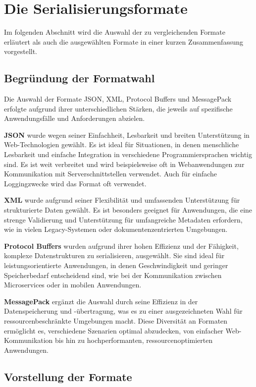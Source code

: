 \documentclass[ngerman]{seminarvorlage}
\begin{document}
\section{Die Serialisierungsformate}

Im folgenden Abschnitt wird die Auswahl der zu vergleichenden Formate erläutert als auch die ausgewählten Formate in einer kurzen Zusammenfassung vorgestellt.

\subsection{Begründung der Formatwahl}

Die Auswahl der Formate JSON, XML, Protocol Buffers und MessagePack erfolgte aufgrund ihrer unterschiedlichen Stärken, die jeweils auf spezifische Anwendungsfälle und Anforderungen abzielen.

\textbf{JSON} \cite{rfc8259} wurde wegen seiner Einfachheit, Lesbarkeit und breiten Unterstützung in Web-Technologien gewählt. Es ist ideal für Situationen, in denen menschliche Lesbarkeit und einfache Integration in verschiedene Programmiersprachen wichtig sind. Es ist weit verbreitet und wird beispielsweise oft in Webanwendungen zur Kommunikation mit Serverschnittstellen verwendet. Auch für einfache Loggingzwecke wird das Format oft verwendet.

\textbf{XML} \cite{w3c_xml} wurde aufgrund seiner Flexibilität und umfassenden Unterstützung für strukturierte Daten gewählt. Es ist besonders geeignet für Anwendungen, die eine strenge Validierung und Unterstützung für umfangreiche Metadaten erfordern, wie in vielen Legacy-Systemen oder dokumentenzentrierten Umgebungen.

\textbf{Protocol Buffers} \cite{protobuf} wurden aufgrund ihrer hohen Effizienz und der Fähigkeit, komplexe Datenstrukturen zu serialisieren, ausgewählt. Sie sind ideal für leistungsorientierte Anwendungen, in denen Geschwindigkeit und geringer Speicherbedarf entscheidend sind, wie bei der Kommunikation zwischen Microservices oder in mobilen Anwendungen.

\textbf{MessagePack} \cite{msgpack} ergänzt die Auswahl durch seine Effizienz in der Datenspeicherung und -übertragung, was es zu einer ausgezeichneten Wahl für ressourcenbeschränkte Umgebungen macht. Diese Diversität an Formaten ermöglicht es, verschiedene Szenarien optimal abzudecken, von einfacher Web-Kommunikation bis hin zu hochperformanten, ressourcenoptimierten Anwendungen.

\subsection{Vorstellung der Formate}
\end{document}
